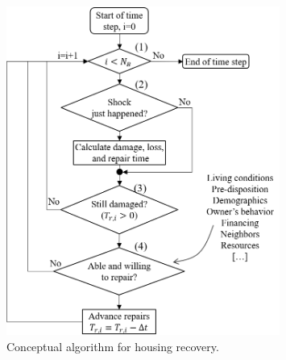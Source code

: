 \begin{figure}[htb]
    \centering
    \includegraphics[width=0.8\textwidth, angle = 0]{Figures/HousingRecovery.png}
    \caption{Conceptual algorithm for housing recovery.}
    \label{fig:HousingRecovery}
\end{figure}


